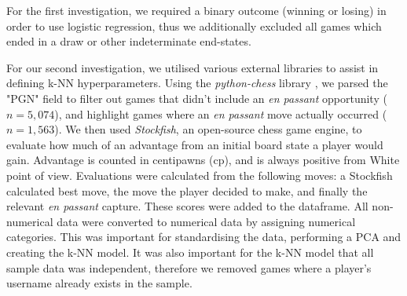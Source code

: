 \documentclass[10pt,a4paper]{article}
\begin{document}
\begin{multicols}{2}
For the first investigation, we required a binary outcome (winning or losing) in order to use logistic regression, thus we additionally excluded all games which ended in a draw or other indeterminate end-states. \newline

For our second investigation, we utilised various external libraries to assist in defining k-NN hyperparameters. Using the \textit{python-chess} library \cite{python-chess}, we parsed the "PGN" field to filter out games that didn't include an \textit{en passant} opportunity ($n=5,074$), and highlight games where an \textit{en passant} move actually occurred ($n=1,563$). We then used \textit{Stockfish}\cite{StockFish}, an open-source chess game engine, to evaluate how much of an advantage from an initial board state a player would gain. Advantage is counted in centipawns (cp), and is always positive from White point of view. Evaluations were calculated from the following moves: a Stockfish calculated best move, the move the player decided to make, and finally the relevant \textit{en passant} capture. These scores were added to the dataframe. All non-numerical data were converted to numerical data by assigning numerical categories. This was important for standardising the data, performing a PCA and creating the k-NN model. It was also important for the k-NN model that all sample data was independent, therefore we removed games where a player's username already exists in the sample.\newline



\end{multicols}
\end{document}
